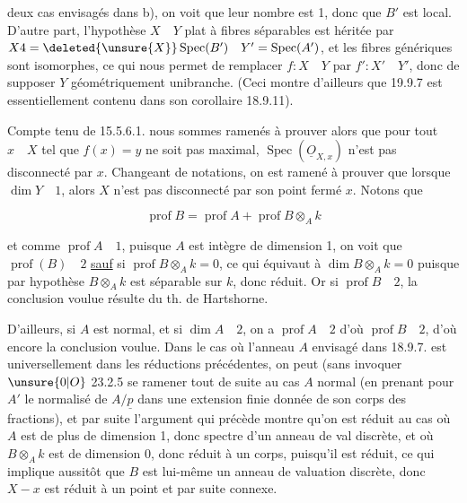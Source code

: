 
deux cas envisagés dans b), on voit que leur nombre est 1, donc que $B'$ est local. D'autre part, l'hypothèse $X\quad Y$ plat à fibres séparables est héritée par $X4=\deleted{\unsure{X}}\operatorname{Spec}(B')\quad Y'=\operatorname{Spec}(A')$, et les fibres génériques sont isomorphes, ce qui nous permet de remplacer $f:X\quad Y$ par $f':X'\quad Y'$, donc de supposer $Y$ géométriquement unibranche. (Ceci montre d'ailleurs que 19.9.7 est essentiellement contenu dans son corollaire 18.9.11).

Compte tenu de 15.5.6.1. nous sommes ramenés à prouver alors que pour tout $x\quad X$ tel que $f(x)=y$ ne soit pas maximal, $\operatorname{Spec}(\underline O_{X,x})$ n'est pas disconnecté par $x$. Changeant de notations, on est ramené à prouver que lorsque $\dim Y\quad 1$, alors $X$ n'est pas disconnecté par son point fermé $x$. Notons que

\[
\operatorname{prof} B=\operatorname{prof} A+\operatorname{prof} B\otimes_A k
\]

et comme $\operatorname{prof} A\quad 1$, puisque $A$ est intègre de dimension 1, on voit que $\operatorname{prof}(B)\quad 2$ \uline{sauf} si $\operatorname{prof} B\otimes_A k=0$, ce qui équivaut à $\dim B\otimes_A k=0$ puisque par hypothèse $B\otimes_A k$ est séparable sur $k$, donc  réduit. Or si $\operatorname{prof} B\quad 2$, la conclusion voulue résulte du th. de Hartshorne. 

D'ailleurs, si $A$ est normal,  et si $\dim A\quad 2$, on a $\operatorname{prof} A\quad 2$ d'où $\operatorname{prof} B\quad 2$, d'où encore la conclusion voulue. Dans le cas où l'anneau $A$ envisagé dans 18.9.7. est universellement      dans les réductions précédentes, on peut (sans invoquer $\unsure{0|O}$ 23.2.5 se ramener  tout de suite au cas $A$ normal (en prenant pour $A'$
le normalisé de $A/\underline p$ dans une extension finie donnée de son corps des fractions), et par suite  l'argument qui précède montre qu'on est réduit au cas où $A$ est de plus de dimension 1, donc spectre d'un anneau de val discrète, et où $B\otimes_A k$ est de dimension 0, donc réduit à un corps, puisqu'il est réduit, ce qui implique aussitôt que $B$ est lui-même un anneau de valuation discrète, donc $X-x$ est réduit à un point et par suite connexe.
